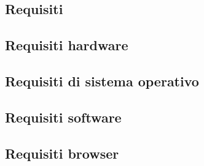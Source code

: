 \documentclass[10pt]{article}
\begin{document}
\begin{justify}
\section{Requisiti}
\label{requisiti}

\subsection{Requisiti hardware}

\subsection{Requisiti di sistema operativo}

\subsection{Requisiti software}

\subsection{Requisiti browser}






\end{justify}
\end{document}
